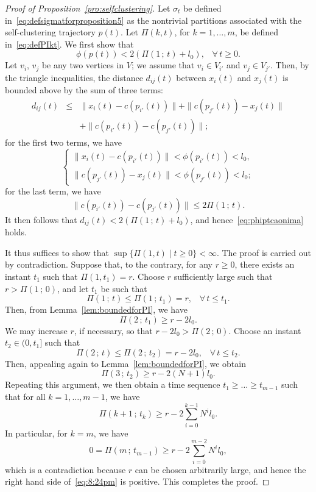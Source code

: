 \documentclass[10pt,twocolumn,twoside]{IEEEtran}
\renewcommand{\(}{\left (}
\renewcommand{\)}{\right )}
\renewcommand{\;}{\,;\,}
\begin{document}
\begin{proof}[Proof of Proposition~\ref{pro:selfclustering}]
Let $\sigma_t$ be defined in~\eqref{eq:defsigmatforproposition5} as the nontrivial partitions associated with the self-clustering trajectory $p(t)$. Let $\Pi(k, t)$, for $k = 1,\ldots, m$, be defined in~\eqref{eq:defPIkt}. We first show that  
\begin{equation}\label{eq:phiptcaonima}
 \phi(p(t)) <2(\Pi(1\; t) + l_0), \hspace{10pt} \forall\, t \ge 0.
\end{equation} 
Let $v_{i}$, $v_{j}$ be any two vertices in $V$; we assume that $v_{i} \in V_{i'}$ and $v_{j}\in V_{j'}$. Then, by the triangle inequalities, the distance $d_{ij}(t)$ between $x_i(t)$ and $x_j(t)$ is bounded above by the sum of three terms: 
$$
\begin{array}{lll}
d_{ij}(t)  & \le & \|x_{i}(t) - c(p_{i'}(t))\|  + \| c(p_{j'}(t)) - x_{j}(t) \| \\
& & +   \|  c(p_{i'}(t)) - c(p_{j'}(t)) \|;
\end{array}
$$
for the first two terms, we have
$$
\left\{
\begin{array}{l}
 \|x_{i}(t) - c(p_{i'}(t))\| < \phi(p_{i'}(t)) < l_0, \\
 \| c(p_{j'}(t)) - x_{j}(t) \| < \phi(p_{j'}(t)) < l_0; 
\end{array}
\right.
$$
for the last term, we have
$$
\| c(p_{i'}(t)) - c(p_{j'}(t))\| \le   2 \Pi(1\; t).
$$
It then follows that $d_{ij}(t) < 2(\Pi(1\; t) + l_0)$, and hence~\eqref{eq:phiptcaonima} holds. 

It thus suffices to show that $\sup \{\Pi(1, t)\mid t \ge 0 \} < \infty$. The proof is carried out by contradiction. Suppose that, to the contrary, for any $r \ge 0$, there exists an instant $t_1$ such that $\Pi(1,t_1) = r$. Choose $r$ sufficiently large such that $r > \Pi(1\; 0)$, and let $t_1$ be such that 
$$\Pi(1\; t)  \le \Pi(1\; t_1) = r, \hspace{10pt} \forall\,  t \le t_1.$$  
Then, from Lemma~\ref{lem:boundedforPI}, we have 
$$
\Pi(2\; t_1) \ge r -  2 l_0. 
$$
We may increase $r$, if necessary, so that $r - 2 l_0 > \Pi(2\; 0)$. Choose an instant~$t_2 \in (0, t_1]$ such that     
$$
\Pi(2\; t)  \le \Pi(2\; t_2) = r -  2 l_0, \hspace{10pt} \forall\,  t \le t_2.
$$
Then, appealing again to Lemma~\ref{lem:boundedforPI}, we obtain
$$
\Pi(3\; t_2) \ge r -  2(N + 1) l_0.
$$
Repeating this argument, we then obtain a time sequence  
$
t_1 \ge  \ldots \ge t_{m-1}
$ 
such that for all $k = 1,\ldots, m-1$, we have
$$
\Pi(k+1\; t_k) \ge r - 2 \sum^{k-1}_{i = 0} N^i  l_0.
$$
In particular, for $k= m$, we have
\begin{equation}\label{eq:8:24pm}
0 = \Pi(m\; t_{m-1}) \ge r - 2 \sum^{m - 2}_{i = 0} N^i  l_0,
\end{equation}
which is a contradiction because  $r$ can be chosen arbitrarily large, and hence the right hand side of~\eqref{eq:8:24pm} is positive. This completes the proof.
\end{proof}
\end{document}
